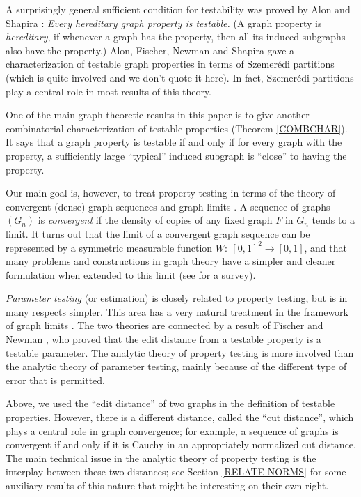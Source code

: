 \documentclass{article}
\begin{document}
A surprisingly general sufficient condition for testability was
proved by Alon and Shapira \cite{AS}: {\it Every hereditary graph
property is testable.} (A graph property is {\it hereditary}, if
whenever a graph has the property, then all its induced subgraphs
also have the property.) Alon, Fischer, Newman and Shapira
\cite{AFNS} gave a characterization of testable graph properties in
terms of Szemer\'edi partitions (which is quite involved  and we
don't quote it here). In fact, Szemer\'edi partitions play a central
role in most results of this theory.

One of the main graph theoretic results in this paper is to give
another combinatorial characterization of testable properties
(Theorem \ref{COMBCHAR}). It says that a graph property is testable
if and only if for every graph with the property, a sufficiently
large ``typical'' induced subgraph is ``close'' to having the
property.

Our main goal is, however, to treat property testing in terms of the
theory of convergent (dense) graph sequences and graph limits
\cite{LSz,LSz2,BCLSV1}. A sequence of graphs $(G_n)$ is {\it
convergent} if the density of copies of any fixed graph $F$ in $G_n$
tends to a limit. It turns out that the limit of a convergent graph
sequence can be represented by a symmetric measurable function
$W:~[0,1]^2\to[0,1]$, and that many problems and constructions in
graph theory have a simpler and cleaner formulation when extended to
this limit (see \cite{BCLSV0} for a survey).

{\it Parameter testing} (or estimation) is closely related to
property testing, but is in many respects simpler. This area has a
very natural treatment in the framework of graph limits
\cite{BCLSSV,BCLSV1}. The two theories are connected by a result of
Fischer and Newman \cite{FN}, who proved that the edit distance from
a testable property is a testable parameter. The analytic theory of
property testing is more involved than the analytic theory of
parameter testing, mainly because of the different type of error that
is permitted.

Above, we used the ``edit distance'' of two graphs in the definition
of testable properties. However, there is a different distance,
called the ``cut distance'', which plays a central role in graph
convergence; for example, a sequence of graphs is convergent if and
only if it is Cauchy in an appropriately normalized cut distance. The
main technical issue in the analytic theory of property testing is
the interplay between these two distances; see Section
\ref{RELATE-NORMS} for some auxiliary results of this nature that
might be interesting on their own right.
\end{document}
